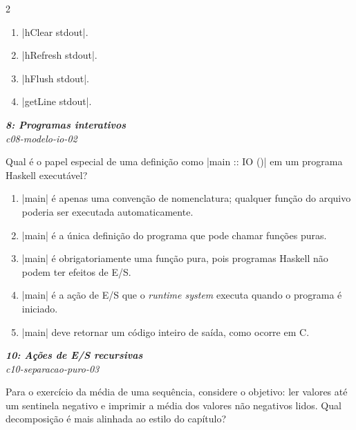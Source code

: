 \documentclass[a4paper,10pt,brazil]{article}
\begin{document}
\begin{multicols}{2}
\begin{enumerate}
  \item \haskellinline|hClear stdout|.

  \item \haskellinline|hRefresh stdout|.

  \item \haskellinline|hFlush stdout|.

  \item \haskellinline|getLine stdout|.


\end{enumerate}

\begin{flushright}
  \footnotesize
  \textit{\textbf{8: Programas interativos}}\\
  \textit{c08-modelo-io-02}\\

\end{flushright}
Qual é o papel especial de uma definição como \haskellinline|main :: IO ()| em um programa Haskell executável?

\begin{enumerate}
  \item \haskellinline|main| é apenas uma convenção de nomenclatura; qualquer função do arquivo poderia ser executada automaticamente.

  \item \haskellinline|main| é a única definição do programa que pode chamar funções puras.

  \item \haskellinline|main| é obrigatoriamente uma função pura, pois programas Haskell não podem ter efeitos de E/S.

  \item \haskellinline|main| é a ação de E/S que o \emph{runtime system} executa quando o programa é iniciado.

  \item \haskellinline|main| deve retornar um código inteiro de saída, como ocorre em C.


\end{enumerate}

\begin{flushright}
  \footnotesize
  \textit{\textbf{10: Ações de E/S recursivas}}\\
  \textit{c10-separacao-puro-03}\\

\end{flushright}
Para o exercício da média de uma sequência, considere o objetivo: ler valores até um sentinela negativo e imprimir a média dos valores não negativos lidos. Qual decomposição é mais alinhada ao estilo do capítulo?


\end{multicols}
\end{document}
